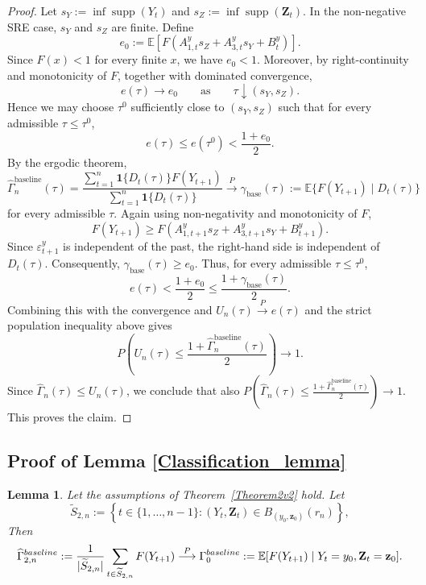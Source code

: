 \documentclass[a4paper,11pt]{article}
\newtheorem{lemma}{Lemma}
\newcommand{\baseline}{{\rm baseline}}
\begin{document}
\begin{proof}
Let \(s_Y:=\inf\operatorname{supp}(Y_t)\) and
\(s_Z:=\inf\operatorname{supp}(\mathbf Z_t)\). In the non-negative SRE case,
\(s_Y\) and \(s_Z\) are finite. Define
\[
e_0
:=
\mathbb E\!\left[
F\!\left(
A^y_{1,t}s_Z+A^y_{3,t}s_Y+B^y_t
\right)
\right].
\]
Since \(F(x)<1\) for every finite \(x\), we have \(e_0<1\). Moreover, by
right-continuity and monotonicity of \(F\), together with dominated convergence,
\[
e(\tau)\longrightarrow e_0
\qquad\text{as}\qquad
\tau\downarrow (s_Y,s_Z).
\]
Hence we may choose \(\tau^0\) sufficiently close to \((s_Y,s_Z)\) such that for every admissible
\(\tau\le \tau^0\),
\[
e(\tau)\le e(\tau^0)<\frac{1+e_0}{2}.
\]
By the ergodic theorem,
\[
\widehat\Gamma^{\mathrm{baseline}}_n(\tau)
=
\frac{\sum_{t=1}^n \mathbf 1\{D_t(\tau)\}F(Y_{t+1})}
     {\sum_{t=1}^n \mathbf 1\{D_t(\tau)\}}
\overset{P}{\longrightarrow}
\gamma_{\mathrm{base}}(\tau):=
\mathbb E\{F(Y_{t+1})\mid D_t(\tau)\}
\]
for every admissible \(\tau\). Again using non-negativity and monotonicity of \(F\),
\[
F(Y_{t+1})
\ge
F\!\left(
A^y_{1,t+1}s_Z+A^y_{3,t+1}s_Y+B^y_{t+1}
\right).
\]
Since \(\varepsilon^y_{t+1}\) is independent of the past, the right-hand side is
independent of \(D_t(\tau)\). Consequently, \(
\gamma_{\mathrm{base}}(\tau)\ge e_0.
\) Thus, for every admissible \(\tau\le\tau^0\),
\[
e(\tau)
<
\frac{1+e_0}{2}
\le
\frac{1+\gamma_{\mathrm{base}}(\tau)}{2}.
\]
Combining this with the convergence and
\(U_n(\tau)\overset{P}{\to}e(\tau)\) and the strict population inequality above gives
\[
P\left(
U_n(\tau)\le
\frac{1+\widehat\Gamma^{\mathrm{baseline}}_n(\tau)}{2}
\right)\to 1.
\]
Since \(\widehat\Gamma_n(\tau)\le U_n(\tau)\), we conclude that also
\(
P\left(
\widehat\Gamma_n(\tau)
\le
\frac{1+\widehat\Gamma^{\mathrm{baseline}}_n(\tau)}{2}
\right)\to 1.
\)
This proves the claim.
\end{proof}

\newpage
\subsection{Proof of Lemma \ref{Classification_lemma}}
\label{proof_of_classicication_lemma}

\begin{lemma}
\label{lemma:S2_baseline_consistency}
Let the assumptions of Theorem~\ref{Theorem2v2} hold. Let
\[
    \widetilde S_{2,n}
    :=
    \left\{
        t\in\{1,\ldots,n-1\}:
        (Y_t,\mathbf Z_t)\in B_{(y_0,\mathbf z_0)}(r_n)
    \right\},
\]
Then 
\[
    \widehat\Gamma^{\baseline}_{2,n}
    :=
    \frac{1}{|\widetilde S_{2,n}|}
    \sum_{t\in\widetilde S_{2,n}} F(Y_{t+1})  \overset{P}{\longrightarrow}
    \Gamma^{\baseline}_0
    :=
    \mathbb E[
        F(Y_{t+1})
        \mid
        Y_t=y_0,\mathbf Z_t=\mathbf z_0
    ].
\]
\end{lemma}
\end{document}
